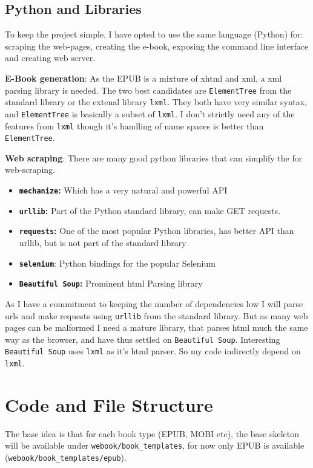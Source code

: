 \documentclass[]{report}   %
\begin{document}
\subsection{Python and Libraries}
To keep the project simple, I have opted to use the same language (Python) for:
scraping the web-pages, creating the e-book, exposing the command line
interface and creating web server.

\textbf{E-Book generation}: As the EPUB is a mixture of xhtml and xml, a xml
parsing library is needed. The two best candidates are \texttt{ElementTree}
from the standard library or the extenal library \texttt{lxml}. They both have
very similar syntax, and \texttt{ElementTree} is basically a subset of
\texttt{lxml}. I don't strictly need any of the features from \texttt{lxml}
though it's handling of name spaces is better than \texttt{ElementTree}.

\textbf{Web scraping}: There are many good python libraries that can simplify the for web-scraping.
\begin{itemize}
    \item \textbf{\texttt{mechanize}:} Which has a very natural and powerful API
    \item \textbf{\texttt{urllib}:} Part of the Python standard library, can make GET requests.
    \item \textbf{\texttt{requests}:} One of the most popular Python libraries,
        has better API than urllib, but is not part of the standard library
	\item \textbf{\texttt{selenium}}\cite{py_selenium}: Python bindings for the popular Selenium\cite{selenium}
    \item \textbf{\texttt{Beautiful Soup}:} Prominent html Parsing library
\end{itemize}
As I have a commitment to keeping the number of dependencies low I will parse
urls and make requests using \texttt{urllib} from the standard library. But as
many web pages can be malformed I need a mature library, that parses html much
the same way as the browser, and have thus settled on \texttt{Beautiful Soup}.
Interesting \texttt{Beautiful Soup} uses \texttt{lxml} as it's html parser. So
my code indirectly depend on \texttt{lxml}.

\section{Code and File Structure}
The base idea is that for each book type (EPUB, MOBI etc), the base skeleton
will be available under \texttt{webook/book\_templates}, for now only EPUB is
available (\texttt{webook/book\_templates/epub\/}).
\end{document}
